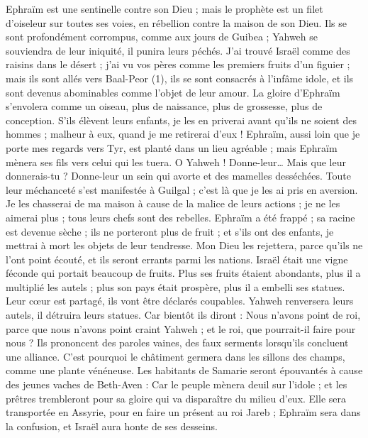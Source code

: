 \begin{multicols}{2}
Ephraïm est une sentinelle contre son Dieu ; mais le prophète est un filet d'oiseleur sur toutes ses voies, en rébellion contre la maison de son Dieu.
Ils se sont profondément corrompus, comme aux jours de Guibea ; Yahweh se souviendra de leur iniquité, il punira leurs péchés.
J’ai trouvé Israël comme des raisins dans le désert ; j'ai vu vos pères comme les premiers fruits d’un figuier ; mais ils sont allés vers Baal-Peor (1), ils se sont consacrés à l’infâme idole, et ils sont devenus abominables comme l’objet de leur amour.
La gloire d'Ephraïm s'envolera comme un oiseau, plus de naissance, plus de grossesse, plus de conception.
S'ils élèvent leurs enfants, je les en priverai avant qu’ils ne soient des hommes ; malheur à eux, quand je me retirerai d'eux !
Ephraïm, aussi loin que je porte mes regards vers Tyr, est planté dans un lieu agréable ; mais Ephraïm mènera ses fils vers celui qui les tuera.
O Yahweh ! Donne-leur… Mais que leur donnerais-tu ? Donne-leur un sein qui avorte et des mamelles desséchées.
Toute leur méchanceté s’est manifestée à Guilgal ; c’est là que je les ai pris en aversion. Je les chasserai de ma maison à cause de la malice de leurs actions ; je ne les aimerai plus ; tous leurs chefs sont des rebelles.
Ephraïm a été frappé ; sa racine est devenue sèche ; ils ne porteront plus de fruit ; et s'ils ont des enfants, je mettrai à mort les objets de leur tendresse.
Mon Dieu les rejettera, parce qu'ils ne l'ont point écouté, et ils seront errants parmi les nations.
\VerseOne{}Israël était une vigne féconde qui portait beaucoup de fruits. Plus ses fruits étaient abondants, plus il a multiplié les autels ; plus son pays était prospère, plus il a embelli ses statues.
Leur cœur est partagé, ils vont être déclarés coupables. Yahweh renversera leurs autels, il détruira leurs statues.
Car bientôt ils diront : Nous n'avons point de roi, parce que nous n'avons point craint Yahweh ; et le roi, que pourrait-il faire pour nous ?
Ils prononcent des paroles vaines, des faux serments lorsqu’ils concluent une alliance. C'est pourquoi le châtiment germera dans les sillons des champs, comme une plante vénéneuse.
Les habitants de Samarie seront épouvantés à cause des jeunes vaches de Beth-Aven : Car le peuple mènera deuil sur l’idole ; et les prêtres trembleront pour sa gloire qui va disparaître du milieu d'eux.
Elle sera transportée en Assyrie, pour en faire un présent au roi Jareb ; Ephraïm sera dans la confusion, et Israël aura honte de ses desseins.

\end{multicols}
